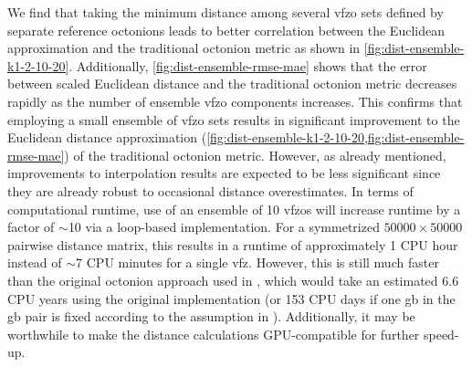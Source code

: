 \documentclass[final,twocolumn,12pt]{elsarticle}
\begin{document}
We find that taking the minimum distance among several \gls{vfzo} sets defined by separate reference octonions leads to better correlation between the Euclidean approximation and the traditional octonion metric as shown in \cref{fig:dist-ensemble-k1-2-10-20}. Additionally, \cref{fig:dist-ensemble-rmse-mae} shows that the error between scaled Euclidean distance and the traditional octonion metric decreases rapidly as the number of ensemble \gls{vfzo} components increases. This confirms that employing a small ensemble of \gls{vfzo} sets results in significant improvement to the Euclidean distance approximation (\cref{fig:dist-ensemble-k1-2-10-20,fig:dist-ensemble-rmse-mae}) of the traditional octonion metric. However, as already mentioned, improvements to interpolation results are expected to be less significant since they are already robust to occasional distance overestimates. In terms of computational runtime, use of an ensemble of 10 \glspl{vfzo} will increase runtime by a factor of $\sim$10 via a loop-based implementation. For a symmetrized $\num{50000}\times\num{50000}$ pairwise distance matrix, this results in a runtime of approximately 1 CPU hour instead of $\sim$7 CPU minutes for a single \gls{vfz}. However, this is still much faster than the original octonion approach used in \cite{chesserLearningGrainBoundary2020}, which would take an estimated 6.6 CPU years using the original implementation (or 153 CPU days if one \gls{gb} in the \gls{gb} pair is fixed according to the assumption in \citet{morawiecDistancesGrainInterfaces2019}). Additionally, it may be worthwhile to make the distance calculations GPU-compatible for further speed-up. %
\end{document}
